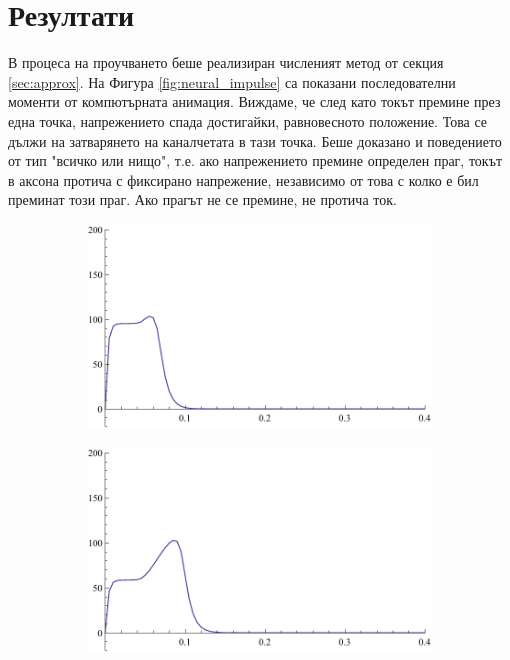\documentclass{article}
\numberwithin{equation}{section}
\begin{document}
    \section{Резултати}
        
    В процеса на проучването беше реализиран численият метод от секция \ref{sec:approx}. На Фигура \ref{fig:neural_impulse} са показани
    последователни моменти от компютърната анимация. Виждаме, че след като токът премине през една точка, напрежението спада достигайки,
    равновесното положение. Това се дължи на затварянето на каналчетата в тази точка. Беше доказано и поведението от тип "всичко или нищо", 
    т.е. ако напрежението премине определен праг, токът в аксона протича с фиксирано напрежение, независимо от това с колко е бил преминат този
    праг. Ако прагът не се премине, не протича ток.
    \begin{figure}[H]
        \centering
        \begin{subfigure}[t]{0.3\textwidth}
            \includegraphics[width=\textwidth]{./schemas/Neuron1.pdf}
        \end{subfigure}
        \begin{subfigure}[t]{0.3\textwidth}
            \includegraphics[width=\textwidth]{./schemas/Neuron2.pdf}

\end{subfigure}
\end{figure}
\end{document}
